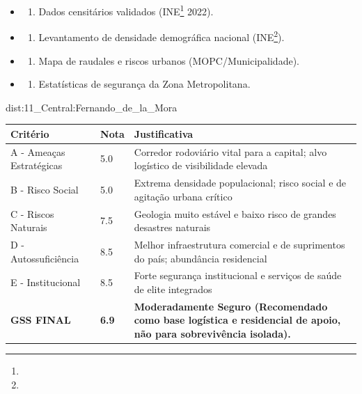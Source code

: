 {\begin{itemize}
\tightlist
\item
  \begin{enumerate}
  \def\labelenumi{\arabic{enumi})}
  \tightlist
  \item
    Dados censitários validados (INE\footnote{\fineINE} 2022).
  \end{enumerate}
\item
  \begin{enumerate}
  \def\labelenumi{\arabic{enumi})}
  \setcounter{enumi}{1}
  \tightlist
  \item
    Levantamento de densidade demográfica nacional (INE\footnote{\fineINE}).
  \end{enumerate}
\item
  \begin{enumerate}
  \def\labelenumi{\arabic{enumi})}
  \setcounter{enumi}{2}
  \tightlist
  \item
    Mapa de raudales e riscos urbanos (MOPC/\allowbreak Municipalidade).
  \end{enumerate}
\item
  \begin{enumerate}
  \def\labelenumi{\arabic{enumi})}
  \setcounter{enumi}{3}
  \tightlist
  \item
    Estatísticas de segurança da Zona Metropolitana.
  \end{enumerate}
\end{itemize}}{dist:11_Central:Fernando_de_la_Mora}
\begin{table}[ht!]
\small \begin{tabular}{p{3.0cm}p{0.8cm}p{6.0cm}} \toprule
\textbf{Critério} & \textbf{Nota} & \textbf{Justificativa} \\ \midrule
A - Ameaças Estratégicas & 5.0 & Corredor rodoviário vital para a capital; alvo logístico de visibilidade elevada \\
B - Risco Social & 5.0 & Extrema densidade populacional; risco social e de agitação urbana crítico \\
C - Riscos Naturais & 7.5 & Geologia muito estável e baixo risco de grandes desastres naturais \\
D - Autossuficiência & 8.5 & Melhor infraestrutura comercial e de suprimentos do país; abundância residencial \\
E - Institucional & 8.5 & Forte segurança institucional e serviços de saúde de elite integrados \\
\midrule \textbf{GSS FINAL} & \textbf{6.9} & \textbf{Moderadamente Seguro (Recomendado como base logística e residencial de apoio, não para sobrevivência isolada).} \\ \bottomrule \end{tabular}
\end{table}
